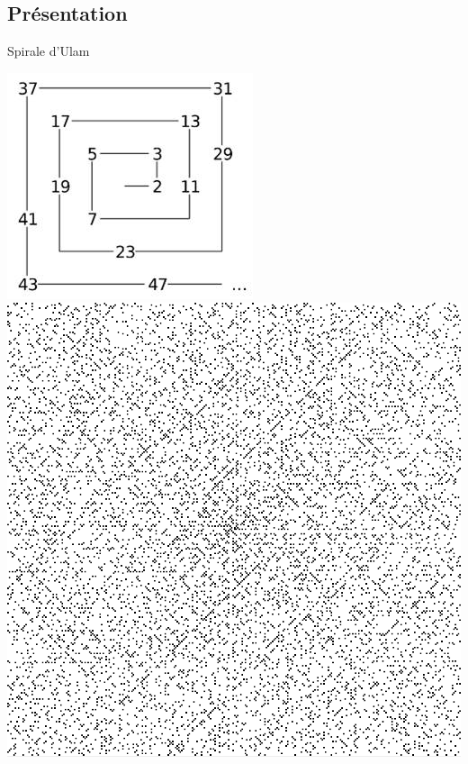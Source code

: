 \documentclass{beamer}
\begin{document}
\subsection*{Présentation}
\begin{frame}
\begin{center}
\vspace{-1cm}
Spirale d'Ulam
\end{center}
\begin{center}
\includegraphics[scale=0.7]{images/spirale_explication.jpg}
\hspace{0.5cm}
\includegraphics[scale=0.25]{images/spirale_explication.PNG}
\end{center}
\end{frame}
\end{document}
